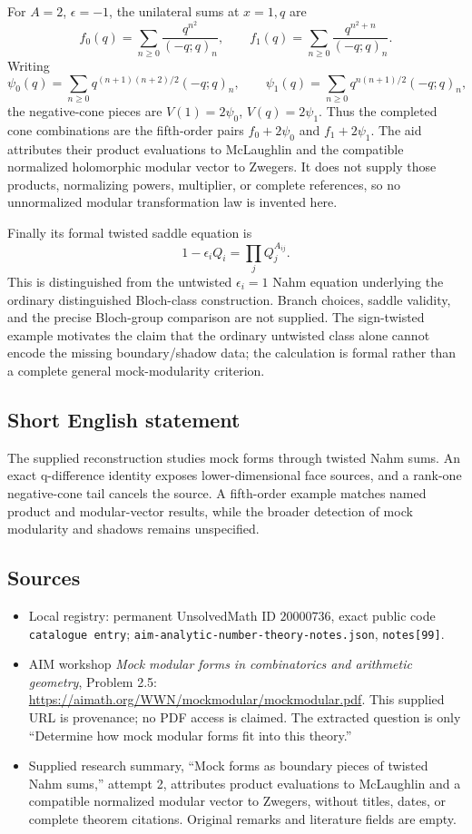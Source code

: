 \documentclass[11pt]{article}
\begin{document}
For \(A=2\), \(\epsilon=-1\), the unilateral sums at \(x=1,q\) are
\[
 f_0(q)=\sum_{n\geq0}\frac{q^{n^2}}{(-q;q)_n},\qquad
 f_1(q)=\sum_{n\geq0}\frac{q^{n^2+n}}{(-q;q)_n}.
\]
Writing
\[
 \psi_0(q)=\sum_{n\geq0}q^{(n+1)(n+2)/2}(-q;q)_n,\qquad
 \psi_1(q)=\sum_{n\geq0}q^{n(n+1)/2}(-q;q)_n,
\]
the negative-cone pieces are \(V(1)=2\psi_0\), \(V(q)=2\psi_1\). Thus the completed cone combinations are the fifth-order pairs \(f_0+2\psi_0\) and \(f_1+2\psi_1\). The aid attributes their product evaluations to McLaughlin and the compatible normalized holomorphic modular vector to Zwegers. It does not supply those products, normalizing powers, multiplier, or complete references, so no unnormalized modular transformation law is invented here.

Finally its formal twisted saddle equation is
\[
 1-\epsilon_iQ_i=\prod_jQ_j^{A_{ij}}.
\]
This is distinguished from the untwisted \(\epsilon_i=1\) Nahm equation underlying the ordinary distinguished Bloch-class construction. Branch choices, saddle validity, and the precise Bloch-group comparison are not supplied. The sign-twisted example motivates the claim that the ordinary untwisted class alone cannot encode the missing boundary/shadow data; the calculation is formal rather than a complete general mock-modularity criterion.
\subsection{Short English statement}
The supplied reconstruction studies mock forms through twisted Nahm sums. An exact q-difference identity exposes lower-dimensional face sources, and a rank-one negative-cone tail cancels the source. A fifth-order example matches named product and modular-vector results, while the broader detection of mock modularity and shadows remains unspecified.
\subsection{Sources}
\begin{itemize}
\item Local registry: permanent UnsolvedMath ID \(20000736\), exact public code \texttt{catalogue entry}; \texttt{aim-analytic-number-theory-notes.json}, \texttt{notes[99]}.
\item AIM workshop \emph{Mock modular forms in combinatorics and arithmetic geometry}, Problem 2.5: \url{https://aimath.org/WWN/mockmodular/mockmodular.pdf}. This supplied URL is provenance; no PDF access is claimed. The extracted question is only ``Determine how mock modular forms fit into this theory.''
\item Supplied research summary, ``Mock forms as boundary pieces of twisted Nahm sums,'' attempt 2, attributes product evaluations to McLaughlin and a compatible normalized modular vector to Zwegers, without titles, dates, or complete theorem citations. Original remarks and literature fields are empty.
\end{itemize}
\end{document}
